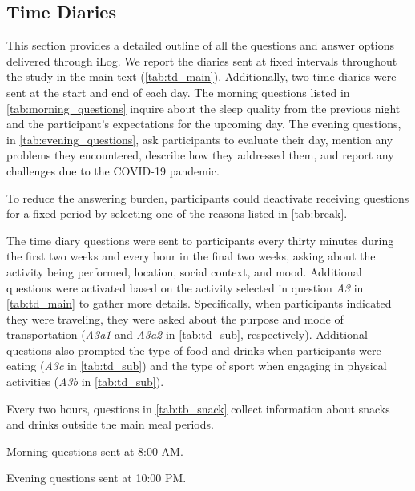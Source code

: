 \subsection{Time Diaries}

This section provides a detailed outline of all the questions and answer options delivered through iLog. We report the diaries sent at fixed intervals throughout the study in the main text (\cref{tab:td_main}). Additionally, two time diaries were sent at the start and end of each day. The morning questions listed in \cref{tab:morning_questions} inquire about the sleep quality from the previous night and the participant’s expectations for the upcoming day. The evening questions, in \cref{tab:evening_questions}, ask participants to evaluate their day, mention any problems they encountered, describe how they addressed them, and report any challenges due to the COVID-19 pandemic.

To reduce the answering burden, participants could deactivate receiving questions for a fixed period by selecting one of the reasons listed in \cref{tab:break}.

The time diary questions were sent to participants every thirty minutes during the first two weeks and every hour in the final two weeks, asking about the activity being performed, location, social context, and mood. Additional questions were activated based on the activity selected in question \textit{A3} in \cref{tab:td_main} to gather more details. Specifically, when participants indicated they were traveling, they were asked about the purpose and mode of transportation (\textit{A3a1} and \textit{A3a2} in \cref{tab:td_sub}, respectively). Additional questions also prompted the type of food and drinks when participants were eating (\textit{A3c} in \cref{tab:td_sub}) and the type of sport when engaging in physical activities (\textit{A3b} in \cref{tab:td_sub}).


Every two hours, questions in \cref{tab:tb_snack} collect information about snacks and drinks outside the main meal periods.

\begin{table}[htb]
    \footnotesize
    \centering
    \caption{Morning questions sent at 8:00 AM.}
    \label{tab:morning_questions}
    
    
    \caption{Evening questions sent at 10:00 PM.}
    \label{tab:evening_questions}
    
\end{table}

